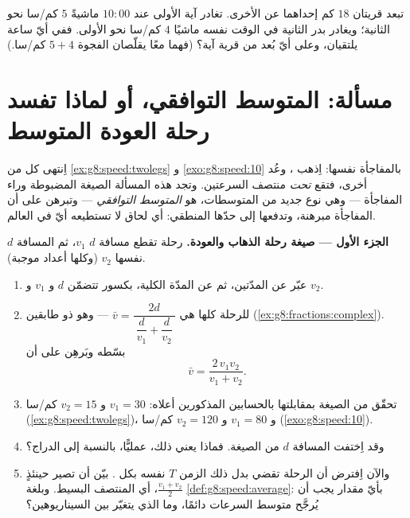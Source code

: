 \begin{exercise}[$\star\star\star$]\label{exo:g8:speed:11}
تبعد قريتان $18$ كم إحداهما عن الأخرى. تغادر آية الأولى عند $10{:}00$
ماشيةً  $5$ كم/سا نحو الثانية؛ ويغادر بدر الثانية في
الوقت نفسه ماشيًا  $4$ كم/سا نحو الأولى. ففي أيّ ساعة
يلتقيان، وعلى أيّ بُعد من قرية آية؟ (فهما معًا
يقلّصان الفجوة  $5 + 4$ كم/سا.)
\end{exercise}

\section{مسألة: المتوسط التوافقي، أو لماذا تفسد رحلة العودة
المتوسط}

\begin{problem}
\label{pb:g8:speed:1}
اِنتهى كل من \cref{ex:g8:speed:twolegs} و \cref{exo:g8:speed:10}
بالمفاجأة نفسها: اِذهب ، وعُد 
أخرى، فتقع  \emph{تحت} منتصف
السرعتين. وتجد هذه المسألة الصيغة المضبوطة وراء المفاجأة
--- وهي نوع جديد من المتوسطات، هو \emph{المتوسط
التوافقي} --- وتبرهن على أن المفاجأة
مبرهنة، وتدفعها إلى حدّها المنطقي: أي لحاق لا تستطيعه
أيّ  في العالم.

\medskip
\noindent\textbf{الجزء الأول --- صيغة رحلة الذهاب والعودة.}
رحلة تقطع مسافة $d$  $v_1$، ثم المسافة
$d$ نفسها  $v_2$ (وكلها أعداد موجبة).
\begin{enumerate}
  \item عبّر عن المدّتين، ثم عن المدّة الكلية، بكسور
        تتضمّن $d$ و $v_1$ و $v_2$.
  \item {} للرحلة كلها هي
        $\bar v = \dfrac{2d}{\ \dfrac{d}{v_1} + \dfrac{d}{v_2}\ }$
        --- وهو  ذو طابقين
        (\cref{ex:g8:fractions:complex}). بسّطه وبَرهِن على أن
        \[
        \bar v = \frac{2\, v_1 v_2}{v_1 + v_2} .
        \]
  \item تحقّق من الصيغة بمقابلتها بالحسابين المذكورين أعلاه:
        $v_1 = 30$ و $v_2 = 15$ كم/سا
        (\cref{ex:g8:speed:twolegs})، و $v_1 = 80$ و
        $v_2 = 120$ كم/سا (\cref{exo:g8:speed:10}).
  \item وقد اِختفت المسافة $d$ من الصيغة. فماذا يعني ذلك،
        عمليًّا، بالنسبة إلى الدراج؟
  \item والآن اِفترض أن الرحلة تقضي بدل ذلك الزمن
        $T$ نفسه بكل . بيّن أن  تصير حينئذٍ $\frac{v_1 + v_2}{2}$، أي المنتصف البسيط.
        وبلغة \cref{def:g8:speed:average}: بأيّ
        مقدار يجب أن يُرجَّح متوسط السرعات دائمًا،
        وما الذي يتغيّر بين السيناريوهين؟
\end{enumerate}


\end{problem}
